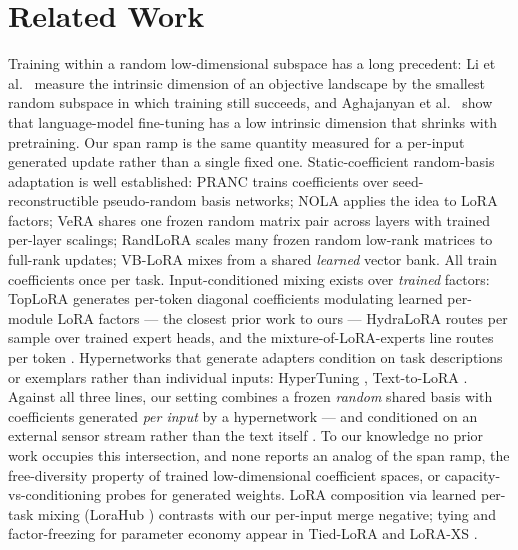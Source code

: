 \documentclass[11pt]{article}
\begin{document}
\section{Related Work}
Training within a random low-dimensional subspace has a long precedent: Li et al.\ \cite{li2018intrinsic} measure the intrinsic dimension of an objective landscape by the smallest random subspace in which training still succeeds, and Aghajanyan et al.\ \cite{aghajanyan2021intrinsic} show that language-model fine-tuning has a low intrinsic dimension that shrinks with pretraining. Our span ramp is the same quantity measured for a per-input generated update rather than a single fixed one. Static-coefficient random-basis adaptation is well established: PRANC \cite{nooralinejad2023pranc} trains coefficients over seed-reconstructible pseudo-random basis networks; NOLA \cite{koohpayegani2024nola} applies the idea to LoRA factors; VeRA \cite{kopiczko2024vera} shares one frozen random matrix pair across layers with trained per-layer scalings; RandLoRA \cite{albert2025randlora} scales many frozen random low-rank matrices to full-rank updates; VB-LoRA \cite{li2024vblora} mixes from a shared \emph{learned} vector bank. All train coefficients once per task. Input-conditioned mixing exists over \emph{trained} factors: TopLoRA \cite{li2025toplora} generates per-token diagonal coefficients modulating learned per-module LoRA factors --- the closest prior work to ours --- HydraLoRA \cite{tian2024hydralora} routes per sample over trained expert heads, and the mixture-of-LoRA-experts line routes per token \cite{wu2024mole}. Hypernetworks that generate adapters condition on task descriptions or exemplars rather than individual inputs: HyperTuning \cite{phang2022hypertuning}, Text-to-LoRA \cite{charakorn2025texttolora}. Against all three lines, our setting combines a frozen \emph{random} shared basis with coefficients generated \emph{per input} by a hypernetwork --- and conditioned on an external sensor stream rather than the text itself \cite{penov2026bridges}. To our knowledge no prior work occupies this intersection, and none reports an analog of the span ramp, the free-diversity property of trained low-dimensional coefficient spaces, or capacity-vs-conditioning probes for generated weights. LoRA composition via learned per-task mixing (LoraHub \cite{huang2024lorahub}) contrasts with our per-input merge negative; tying and factor-freezing for parameter economy appear in Tied-LoRA \cite{renduchintala2024tiedlora} and LoRA-XS \cite{balazy2024loraxs}.
\end{document}
